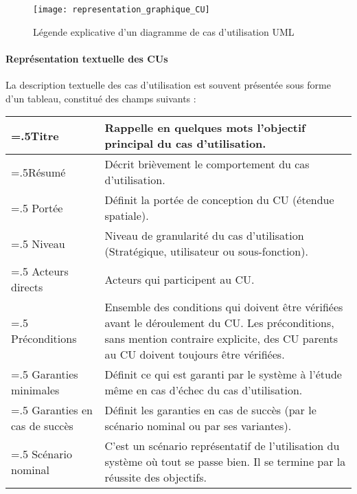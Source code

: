 \begin{figure} [H]
  \centering
  \texttt{[image: representation\_graphique\_CU]}
  \caption{Légende explicative d'un diagramme de cas d'utilisation UML}
  \label{representation_graphique_CU}
\end{figure}

\paragraph{Représentation textuelle des CUs}

La description textuelle des cas d’utilisation est souvent présentée sous forme d’un tableau, constitué des champs suivants :
\newline
\begin{table}[H]
  \centering
  \begin{tabularx}{\textwidth}{|>{\hsize=.5\hsize}X|>{\hsize=1.5\hsize}X|}
    \hline
    Titre & 
    Rappelle en quelques mots l’objectif principal du cas d’utilisation.\\
    \hline
    Résumé &
    Décrit brièvement le comportement du cas d’utilisation.\\
    \hline
    Portée &
    Définit la portée de conception du CU (étendue spatiale).\\
    \hline
    Niveau &
    Niveau de granularité du cas d’utilisation (Stratégique, utilisateur ou sous-fonction).\\
    \hline
    Acteurs directs &
    Acteurs qui participent au CU.\\
    \hline
    Préconditions &
    Ensemble des conditions qui doivent être vérifiées avant le déroulement du CU. 
    Les préconditions, sans mention contraire explicite, des CU parents au CU doivent toujours être vérifiées.\\
    \hline
    Garanties minimales &
    Définit ce qui est garanti par le système à l’étude même en cas d’échec du cas d’utilisation.\\
    \hline
    Garanties en cas de succès &
    Définit les garanties en cas de succès (par le scénario nominal ou par ses variantes).\\
    \hline
    Scénario nominal &
    C’est un scénario représentatif de l’utilisation du système où tout se passe bien.
    Il se termine par la réussite des objectifs.


\end{tabularx}
\end{table}
